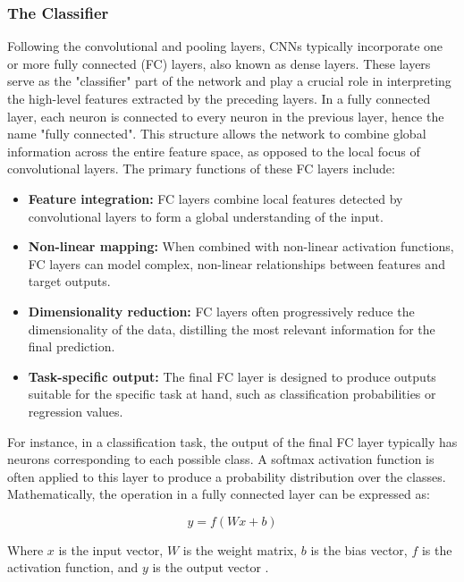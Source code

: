 \subsubsection{The Classifier}
Following the convolutional and pooling layers, CNNs typically incorporate one or more fully connected (FC) layers, also known as dense layers. These layers serve as the "classifier" part of the network and play a crucial role in interpreting the high-level features extracted by the preceding layers.
In a fully connected layer, each neuron is connected to every neuron in the previous layer, hence the name "fully connected". This structure allows the network to combine global information across the entire feature space, as opposed to the local focus of convolutional layers.
The primary functions of these FC layers include:
\begin{itemize}
\item \textbf{Feature integration:} FC layers combine local features detected by convolutional layers to form a global understanding of the input.
\item \textbf{Non-linear mapping:} When combined with non-linear activation functions, FC layers can model complex, non-linear relationships between features and target outputs.
\item \textbf{Dimensionality reduction:} FC layers often progressively reduce the dimensionality of the data, distilling the most relevant information for the final prediction.
\item \textbf{Task-specific output:} The final FC layer is designed to produce outputs suitable for the specific task at hand, such as classification probabilities or regression values.
\end{itemize}
For instance, in a classification task, the output of the final FC layer typically has neurons corresponding to each possible class. A softmax activation function \cite{Softmax} is often applied to this layer to produce a probability distribution over the classes.
Mathematically, the operation in a fully connected layer can be expressed as:

\[
y = f(Wx + b)
\]

Where $x$ is the input vector, $W$ is the weight matrix, $b$ is the bias vector, $f$ is the activation function, and $y$ is the output vector \cite{Klein}.

